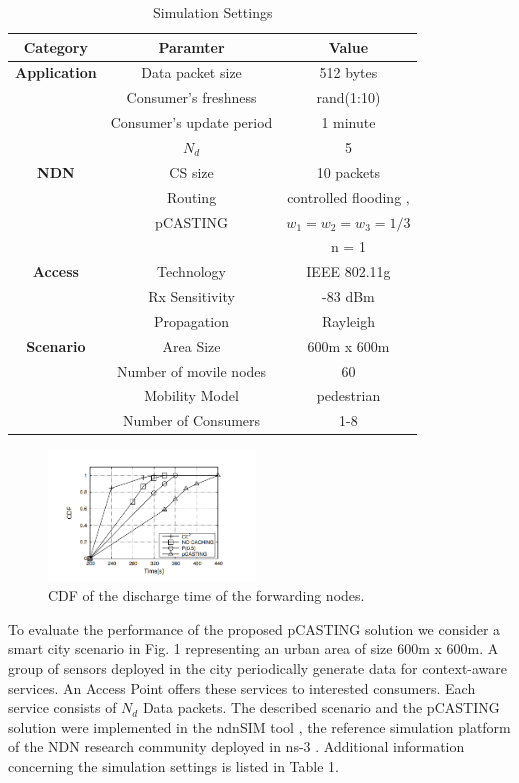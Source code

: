 \documentclass[conference]{IEEEtran}
\begin{document}
\begin{table}[htbp]
    \caption{Simulation Settings}
    \begin{center}
    \begin{tabular}{c|c|c|}
    \textbf{Category} & \textbf{Paramter}& \textbf{Value} \\
    \hline
    \textbf{Application} & Data packet size & 512 bytes \\
    & Consumer's freshness & rand(1:10) \\
    & Consumer's update period & 1 minute \\
    & $N_d$ & 5 \\
    \hline
    \textbf{NDN} & CS size & 10 packets \\
    & Routing & controlled flooding \cite{b6}, \cite{b15} \\
    & pCASTING & $w_1 = w_2 = w_3 = 1 / 3$ \\
    & & n = 1 \\
    \hline
    \textbf{Access} & Technology & IEEE 802.11g \\
    & Rx Sensitivity & -83 dBm \\
    & Propagation & Rayleigh \\
    \hline
    \textbf{Scenario} & Area Size & 600m x 600m \\
    & Number of movile nodes & 60 \\
    & Mobility Model & pedestrian \cite{b16} \\
    & Number of Consumers & 1-8 \\
    \end{tabular}
    \label{tab1}
    \end{center}
\end{table}

\begin{figure}[htbp]
    \centerline{\includegraphics[width=5.5cm]{fig2.png}}
    \caption{CDF of the discharge time of the forwarding nodes.}
    \label{fig2}
\end{figure}

To evaluate the performance of the proposed pCASTING solution we consider a smart city scenario in Fig. 1 representing an urban 
area of size 600m x 600m. A group of sensors deployed in the city periodically generate data for context-aware services. 
An Access Point offers these services to interested consumers. Each service consists of $N_d$ Data packets. The described scenario and the 
pCASTING solution were implemented in the ndnSIM tool \cite{b10}, the reference simulation platform of the NDN research community deployed 
in ns-3 \cite{b18}. Additional information concerning the simulation settings is listed in Table 1.
\end{document}
